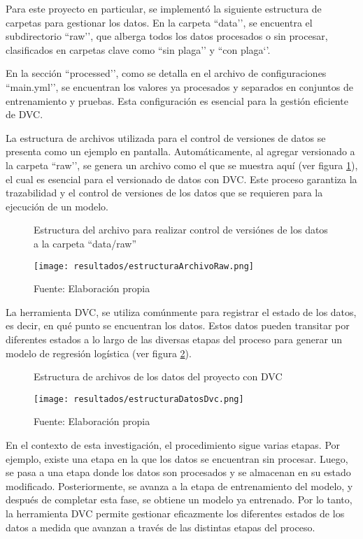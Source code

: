 Para este proyecto en particular, se implementó la siguiente estructura de carpetas para gestionar los datos. En la carpeta ``data’’, se encuentra el subdirectorio ``raw’’, que alberga todos los datos procesados o sin procesar, clasificados en carpetas clave como ``sin plaga’’ y ``con plaga‘’.

\newpage

En la sección ``processed’’, como se detalla en el archivo de configuraciones ``main.yml’’, se encuentran los valores ya procesados y separados en conjuntos de entrenamiento y pruebas. Esta configuración es esencial para la gestión eficiente de DVC. \newline

La estructura de archivos utilizada para el control de versiones de datos se presenta como un ejemplo en pantalla. Automáticamente, al agregar versionado a la carpeta ``raw’’, se genera un archivo como el que se muestra aquí (ver figura \ref{fig:figuraEstructuraArchivoRaw}), el cual es esencial para el versionado de datos con DVC. Este proceso garantiza la trazabilidad y el control de versiones de los datos que se requieren para la ejecución de un modelo.

\begin{figure}[h]
\centering
\caption{Estructura del archivo para realizar control de versiónes de los datos a la carpeta ``data/raw''}
\texttt{[image: resultados/estructuraArchivoRaw.png]}
\caption*{\footnotesize Fuente: Elaboración propia}
\label{fig:figuraEstructuraArchivoRaw}
\end{figure}

\newpage

La herramienta DVC, se utiliza comúnmente para registrar el estado de los datos, es decir, en qué punto se encuentran los datos. Estos datos pueden transitar por diferentes estados a lo largo de las diversas etapas del proceso para generar un modelo de regresión logística (ver figura \ref{fig:figuraEstructuraDatosDvc}).

\begin{figure}[h]
\centering
\caption{Estructura de archivos de los datos del proyecto con DVC}
\texttt{[image: resultados/estructuraDatosDvc.png]}
\caption*{\footnotesize Fuente: Elaboración propia}
\label{fig:figuraEstructuraDatosDvc}
\end{figure}

\newpage

En el contexto de esta investigación, el procedimiento sigue varias etapas. Por ejemplo, existe una etapa en la que los datos se encuentran sin procesar. Luego, se pasa a una etapa donde los datos son procesados y se almacenan en su estado modificado. Posteriormente, se avanza a la etapa de entrenamiento del modelo, y después de completar esta fase, se obtiene un modelo ya entrenado. Por lo tanto, la herramienta DVC permite gestionar eficazmente los diferentes estados de los datos a medida que avanzan a través de las distintas etapas del proceso. \newline

